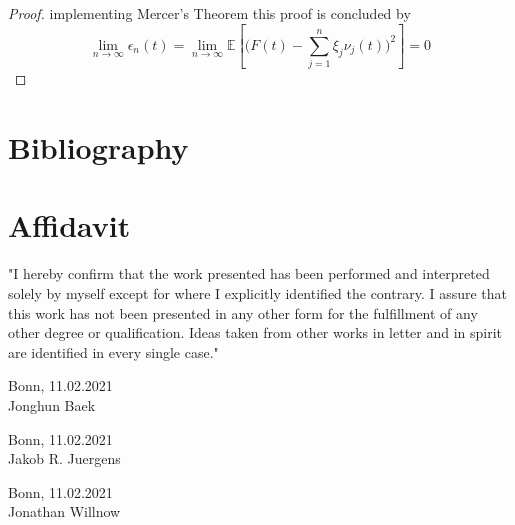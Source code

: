 \documentclass[11pt,twoside,a4paper]{article}
\begin{document}
\begin{proof}
		implementing Mercer's Theorem this proof is concluded by
		\begin{equation}
			\lim\limits_{n \rightarrow \infty} \epsilon_{n}(t) = \lim\limits_{n \rightarrow \infty} \mathbb{E} \left[\bigg( F(t) - \sum_{j=1}^{n} \xi_{j} \nu_{j}(t)\bigg)^2 \right] = 0
		\end{equation}
	\end{proof}

	\newpage
	
	\section{Bibliography}
	\printbibliography[heading=none]	
	
	\newpage
	\section{Affidavit}
	
	\vspace{2cm}
	"I hereby confirm that the work presented has been performed and
	interpreted solely by myself except for where I explicitly identified the
	contrary. I assure that this work has not been presented in any other
	form for the fulfillment of any other degree or qualification. Ideas
	taken from other works in letter and in spirit are identified in every
	single case."
	
	\vspace{2cm}
	Bonn, 11.02.2021 \hrulefill \\
	\hspace*{0mm}Jonghun Baek
	
	\vspace{2cm}
	Bonn, 11.02.2021 \hrulefill \\
	\hspace*{0mm}Jakob R. Juergens
	
	\vspace{2cm}
	Bonn, 11.02.2021 \hrulefill \\
	\hspace*{0mm}Jonathan Willnow
	
	
\end{document}

